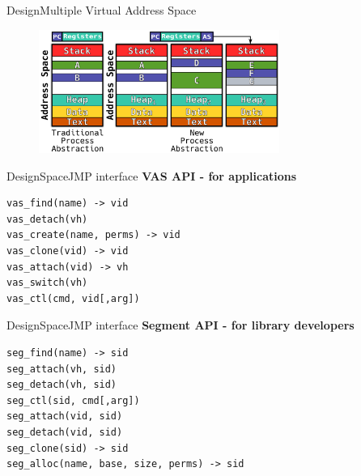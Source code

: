 \documentclass[10pt]{beamer}
\begin{document}
\begin{frame}{Design}{Multiple Virtual Address Space}
  \begin{figure}[ht]
    \centering
    \includegraphics[width=0.7\textwidth, keepaspectratio=true]{images/traditional_vs_new_b.png}
  \end{figure}
\end{frame}

\begin{frame}[fragile]{Design}{SpaceJMP interface}
  \textbf{VAS API - for applications}
\begin{lstlisting}
vas_find(name) -> vid
vas_detach(vh)
vas_create(name, perms) -> vid
vas_clone(vid) -> vid
vas_attach(vid) -> vh
vas_switch(vh)
vas_ctl(cmd, vid[,arg])
\end{lstlisting}
\end{frame}

\begin{frame}[fragile]{Design}{SpaceJMP interface}
  \textbf{Segment API - for library developers}
\begin{lstlisting}
seg_find(name) -> sid
seg_attach(vh, sid)
seg_detach(vh, sid)
seg_ctl(sid, cmd[,arg])
seg_attach(vid, sid)
seg_detach(vid, sid)
seg_clone(sid) -> sid
seg_alloc(name, base, size, perms) -> sid
\end{lstlisting}
\end{frame}

{\1
\begin{frame}

\end{frame}}
\end{document}
